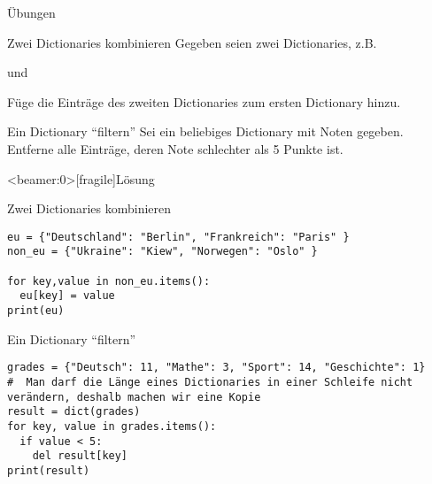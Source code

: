 \begin{frame}{Übungen}

\begin{block}{Zwei Dictionaries kombinieren}
	\vspace{2pt}
Gegeben seien zwei Dictionaries, z.B.  


und 


Füge die Einträge des zweiten Dictionaries zum ersten Dictionary hinzu. 
\end{block}

\pause 

\vspace{12pt}

\begin{block}{Ein Dictionary \enquote{filtern}}
\vspace{2pt}
Sei ein beliebiges Dictionary mit Noten gegeben. Entferne alle Einträge, deren Note schlechter als 5 Punkte ist. 
\end{block}
\end{frame}


\begin{frame}<beamer:0>[fragile]{Lösung}

\begin{solutionblock}{Zwei Dictionaries kombinieren}
\begin{verbatim}
eu = {"Deutschland": "Berlin", "Frankreich": "Paris" }
non_eu = {"Ukraine": "Kiew", "Norwegen": "Oslo" }

for key,value in non_eu.items():
  eu[key] = value
print(eu)
\end{verbatim}
\end{solutionblock}

\vspace{12pt}

\begin{solutionblock}{Ein Dictionary \enquote{filtern}}
\begin{verbatim}
grades = {"Deutsch": 11, "Mathe": 3, "Sport": 14, "Geschichte": 1}
#  Man darf die Länge eines Dictionaries in einer Schleife nicht verändern, deshalb machen wir eine Kopie
result = dict(grades)
for key, value in grades.items():
  if value < 5:
    del result[key]
print(result)
\end{verbatim}
\end{solutionblock}

\end{frame}


